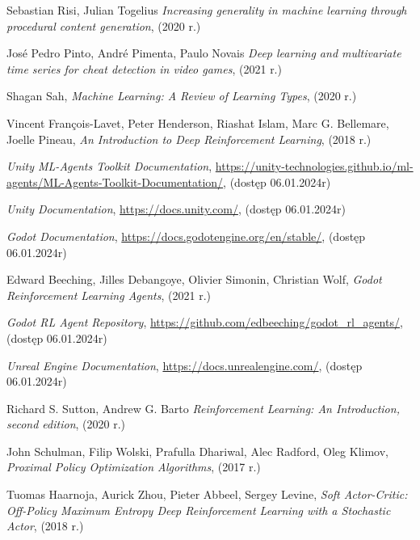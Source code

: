 \documentclass{SGGW-thesis}
\begin{document}
\begin{thebibliography}{9}
  Sebastian Risi, Julian Togelius
  \textit{Increasing generality in machine learning through procedural content generation},
  (2020 r.)

  José Pedro Pinto, André Pimenta, Paulo Novais
  \textit{Deep learning and multivariate time series for cheat detection in video games},
  (2021 r.)
  
  Shagan Sah,
  \textit{Machine Learning: A Review of Learning Types},
  (2020 r.)

  Vincent François-Lavet, Peter Henderson, Riashat Islam, Marc G. Bellemare, Joelle Pineau,
  \textit{An Introduction to Deep Reinforcement Learning},
  (2018 r.)

  \textit{Unity ML-Agents Toolkit Documentation},
  \url{https://unity-technologies.github.io/ml-agents/ML-Agents-Toolkit-Documentation/},
  (dostęp 06.01.2024r)

  \textit{Unity Documentation},
  \url{https://docs.unity.com/},
  (dostęp 06.01.2024r)

  \textit{Godot Documentation},
  \url{https://docs.godotengine.org/en/stable/},
  (dostęp 06.01.2024r)

  Edward Beeching, Jilles Debangoye, Olivier Simonin, Christian Wolf,
  \textit{Godot Reinforcement Learning Agents},
  (2021 r.)

  \textit{Godot RL Agent Repository},
  \url{https://github.com/edbeeching/godot_rl_agents/},
  (dostęp 06.01.2024r)

  \textit{Unreal Engine Documentation},
  \url{https://docs.unrealengine.com/},
  (dostęp 06.01.2024r)
  
  Richard S. Sutton, Andrew G. Barto
  \textit{Reinforcement Learning: An Introduction, second edition},
  (2020 r.)

  John Schulman, Filip Wolski, Prafulla Dhariwal, Alec Radford, Oleg Klimov, 
  \textit{Proximal Policy Optimization Algorithms},
  (2017 r.)

  Tuomas Haarnoja, Aurick Zhou, Pieter Abbeel, Sergey Levine, 
  \textit{Soft Actor-Critic: Off-Policy Maximum Entropy Deep Reinforcement Learning with a Stochastic Actor},
  (2018 r.)


\end{thebibliography}
\end{document}
